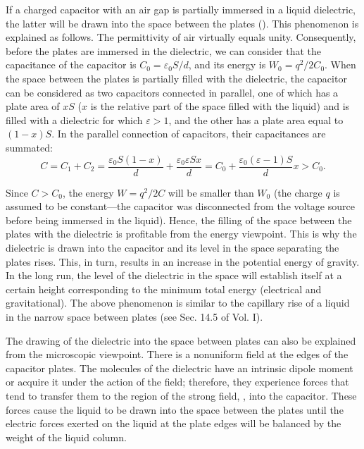 If a charged capacitor with an air gap is partially immersed in a liquid dielectric, the latter will be drawn into the space between the plates (). This phenomenon is explained as follows. The permittivity of air virtually equals unity. Consequently, before the plates are immersed in the dielectric, we can consider that the capacitance of the capacitor is $C_0=\varepsilon_0S/d$, and its energy is $W_0=q^2/2C_0$. When the space between the plates is partially filled with the dielectric, the capacitor can be considered as two capacitors connected in parallel, one of which has a plate area of $xS$ ($x$ is the relative part of the space filled with the liquid) and is filled with a dielectric for which $\varepsilon>1$, and the other has a plate area equal to $(1-x)S$. In the parallel connection of capacitors, their capacitances are summated:
\begin{equation*}
	C = C_1 + C_2 = \frac{\varepsilon_0 S (1-x)}{d} + \frac{\varepsilon_0 \varepsilon S x}{d} = C_0 + \frac{\varepsilon_0 (\varepsilon - 1) S}{d} x > C_0.
\end{equation*}

\noindent
Since $C>C_0$, the energy $W=q^2/2C$ will be smaller than $W_0$ (the charge $q$ is assumed to be constant---the capacitor was disconnected from the voltage source before being immersed in the liquid). Hence, the filling of the space between the plates with the dielectric is profitable from the energy viewpoint. This is why the dielectric is drawn into the capacitor and its level in the space separating the plates rises. This, in turn, results in an increase in the potential energy of gravity. In the long run, the level of the dielectric in the space will establish itself at a certain height corresponding to the minimum total energy (electrical and gravitational). The above phenomenon is similar to the capillary rise of a liquid in the narrow space between plates (see Sec. 14.5 of Vol. I).

The drawing of the dielectric into the space between plates can also be explained from the microscopic viewpoint. There is a nonuniform field at the edges of the capacitor plates. The molecules of the dielectric have an intrinsic dipole moment or acquire it under the action of the field; therefore, they experience forces that tend to transfer them to the region of the strong field, \ie, into the capacitor. These forces cause the liquid to be drawn into the space between the plates until the electric forces exerted on the liquid at the plate edges will be balanced by the weight of the liquid column.

